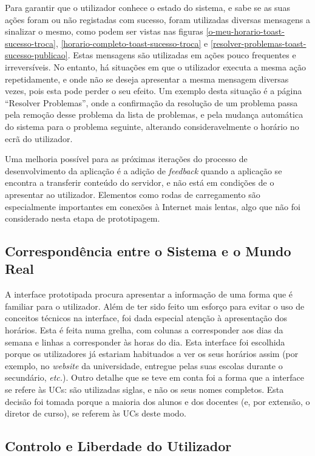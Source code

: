 \documentclass[12pt, a4paper]{article}
\begin{document}
Para garantir que o utilizador conhece o estado do sistema, e sabe se as suas ações foram ou não
registadas com sucesso, foram utilizadas diversas mensagens a sinalizar o mesmo, como podem ser
vistas nas figuras \ref{o-meu-horario-toast-sucesso-troca},
\ref{horario-completo-toast-sucesso-troca} e \ref{resolver-problemas-toast-sucesso-publicao}. Estas
mensagens são utilizadas em ações pouco frequentes e irreversíveis. No entanto, há situações em que
o utilizador executa a mesma ação repetidamente, e onde não se deseja apresentar a mesma mensagem
diversas vezes, pois esta pode perder o seu efeito. Um exemplo desta situação é a página
``Resolver Problemas'', onde a confirmação da resolução de um problema passa pela remoção desse
problema da lista de problemas, e pela mudança automática do sistema para o problema seguinte,
alterando consideravelmente o horário no ecrã do utilizador.

Uma melhoria possível para as próximas iterações do processo de desenvolvimento da aplicação é a
adição de \emph{feedback} quando a aplicação se encontra a transferir conteúdo do servidor, e não
está em condições de o apresentar ao utilizador. Elementos como rodas de carregamento são
especialmente importantes em conexões à Internet mais lentas, algo que não foi considerado nesta
etapa de prototipagem.

\subsection{Correspondência entre o Sistema e o Mundo Real}

A interface prototipada procura apresentar a informação de uma forma que é familiar para o
utilizador. Além de ter sido feito um esforço para evitar o uso de conceitos técnicos na interface,
foi dada especial atenção à apresentação dos horários. Esta é feita numa grelha, com colunas a
corresponder aos dias da semana e linhas a corresponder às horas do dia. Esta interface foi
escolhida porque os utilizadores já estariam habituados a ver os seus horários assim (por exemplo,
no \emph{website} da universidade, entregue pelas suas escolas durante o secundário, \emph{etc.}).
Outro detalhe que se teve em conta foi a forma que a interface se refere às UCs: são utilizadas
siglas, e não os seus nomes completos. Esta decisão foi tomada porque a maioria dos alunos e dos
docentes (e, por extensão, o diretor de curso), se referem às UCs deste modo.

\subsection{Controlo e Liberdade do Utilizador}
\end{document}
